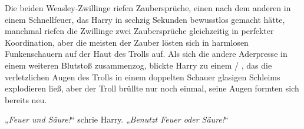 Die beiden Weasley-Zwillinge riefen Zaubersprüche, einen nach dem anderen in einem Schnellfeuer, das Harry in sechzig Sekunden bewusstlos gemacht hätte, manchmal riefen die Zwillinge zwei Zaubersprüche gleichzeitig in perfekter Koordination, aber die meisten der Zauber lösten sich in harmlosen Funkenschauern auf der Haut des Trolls auf. Als sich die andere Aderpresse in einem weiteren Blutstoß zusammenzog, blickte Harry zu einem  / , das die verletzlichen Augen des Trolls in einem doppelten Schauer glasigen Schleims explodieren ließ, aber der Troll brüllte nur noch einmal, seine Augen formten sich bereits neu.

„\emph{Feuer und Säure!}“ schrie Harry.
„\emph{Benutzt Feuer oder Säure!}“

